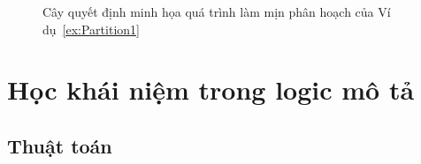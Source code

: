 \begin{figure}[h!]
\caption{Cây quyết định minh họa quá trình làm mịn phân hoạch của Ví dụ~\ref{ex:Partition1}\label{fig:DecisionTree1}}
\end{figure}

\section{Học khái niệm trong logic mô tả}
\label{sec:Chap3.ConceptLearning}
\subsection{Thuật toán \BBCLearnS}
\label{sec:Chap3.BBCL2}

